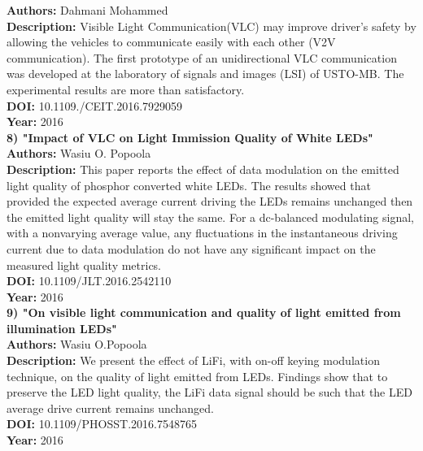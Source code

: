 \documentclass[12pt]{report}	%
\begin{document}
{{{{{{{{{{\textbf{Authors: }Dahmani Mohammed\\
\textbf{Description: }Visible Light Communication(VLC) may improve driver's safety by allowing the vehicles to communicate easily with each other (V2V communication). The first prototype of an unidirectional VLC communication was developed at the laboratory of signals and images (LSI) of USTO-MB. The experimental results are more than satisfactory.\\
\textbf{DOI: }10.1109./CEIT.2016.7929059\\
\textbf{Year: }2016\\
\newline \textbf{8) "Impact of VLC on Light Immission Quality of White LEDs"}\\
\textbf{Authors: }Wasiu O. Popoola\\
\textbf{Description: }This paper reports the effect of data modulation on the emitted light quality of phosphor converted white LEDs. The results showed that provided the expected average current driving the LEDs remains unchanged then the emitted light quality will stay the same. For a dc-balanced modulating signal, with a nonvarying average value, any fluctuations in the instantaneous driving current due to data modulation do not have any significant impact on the measured light quality metrics. \\
\textbf{DOI: }10.1109/JLT.2016.2542110\\
\textbf{Year: }2016\\
\newline \textbf{9) "On visible light communication and quality of light emitted from illumination LEDs"}\\
\textbf{Authors: }Wasiu O.Popoola\\
\textbf{Description: }We present the effect of LiFi, with on-off keying modulation technique, on the quality of light emitted from LEDs. Findings show that to preserve the LED light quality, the LiFi data signal should be such that the LED average drive current remains unchanged.\\
\textbf{DOI: }10.1109/PHOSST.2016.7548765\\
\textbf{Year: }2016\\
  
}}}}}}}}}}
\end{document}
